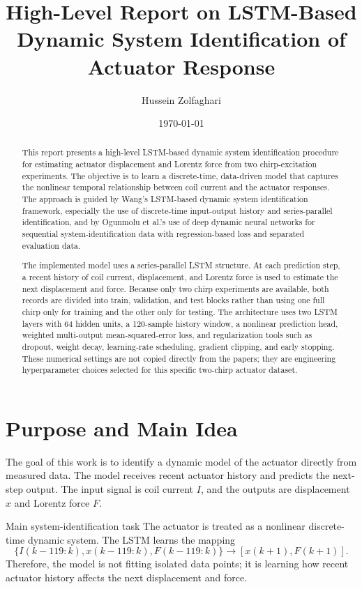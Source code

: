\documentclass[11pt]{article}
\title{High-Level Report on LSTM-Based Dynamic System Identification of Actuator Response}
\author{Hussein Zolfaghari}
\date{\today}
\begin{document}
\maketitle

\begin{abstract}
This report presents a high-level LSTM-based dynamic system identification procedure for estimating actuator displacement and Lorentz force from two chirp-excitation experiments. The objective is to learn a discrete-time, data-driven model that captures the nonlinear temporal relationship between coil current and the actuator responses. The approach is guided by Wang's LSTM-based dynamic system identification framework, especially the use of discrete-time input-output history and series-parallel identification, and by Ogunmolu et al.'s use of deep dynamic neural networks for sequential system-identification data with regression-based loss and separated evaluation data.

The implemented model uses a series-parallel LSTM structure. At each prediction step, a recent history of coil current, displacement, and Lorentz force is used to estimate the next displacement and force. Because only two chirp experiments are available, both records are divided into train, validation, and test blocks rather than using one full chirp only for training and the other only for testing. The architecture uses two LSTM layers with 64 hidden units, a 120-sample history window, a nonlinear prediction head, weighted multi-output mean-squared-error loss, and regularization tools such as dropout, weight decay, learning-rate scheduling, gradient clipping, and early stopping. These numerical settings are not copied directly from the papers; they are engineering hyperparameter choices selected for this specific two-chirp actuator dataset.
\end{abstract}

\section{Purpose and Main Idea}
The goal of this work is to identify a dynamic model of the actuator directly from measured data. The model receives recent actuator history and predicts the next-step output. The input signal is coil current $I$, and the outputs are displacement $x$ and Lorentz force $F$.

\begin{summarybox}{Main system-identification task}
The actuator is treated as a nonlinear discrete-time dynamic system. The LSTM learns the mapping
\begin{equation}
\{I(k-119:k),x(k-119:k),F(k-119:k)\}\rightarrow [x(k+1),F(k+1)].
\end{equation}
Therefore, the model is not fitting isolated data points; it is learning how recent actuator history affects the next displacement and force.
\end{summarybox}
\end{document}
